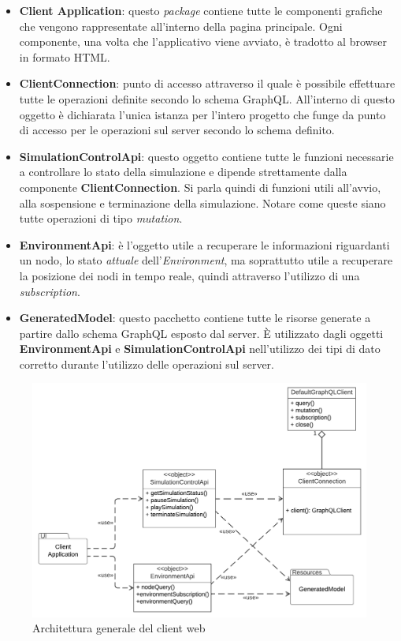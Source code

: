 \begin{itemize}
	\item \textbf{Client Application}: questo \textit{package} contiene tutte le componenti grafiche che vengono rappresentate all'interno della pagina principale. Ogni componente, una volta che l'applicativo viene avviato, è tradotto al browser in formato HTML.
	\item \textbf{ClientConnection}: punto di accesso attraverso il quale è possibile effettuare tutte le operazioni definite secondo lo schema GraphQL. All'interno di questo oggetto è dichiarata l'unica istanza per l'intero progetto che funge da punto di accesso per le operazioni sul server secondo lo schema definito. 
	\item \textbf{SimulationControlApi}: questo oggetto contiene tutte le funzioni necessarie a controllare lo stato della simulazione e dipende strettamente dalla componente \textbf{ClientConnection}. Si parla quindi di funzioni utili all'avvio, alla sospensione e terminazione della simulazione. Notare come queste siano tutte operazioni di tipo \textit{mutation}.
	\item \textbf{EnvironmentApi}: è l'oggetto utile a recuperare le informazioni riguardanti un nodo, lo stato \textit{attuale} dell'\textit{Environment}, ma soprattutto utile a recuperare la posizione dei nodi in tempo reale, quindi attraverso l'utilizzo di una \textit{subscription}. 
	\item \textbf{GeneratedModel}: questo pacchetto contiene tutte le risorse generate a partire dallo schema GraphQL esposto dal server. È utilizzato dagli oggetti \textbf{EnvironmentApi} e \textbf{SimulationControlApi} nell'utilizzo dei tipi di dato corretto durante l'utilizzo delle operazioni sul server.
\end{itemize}

\begin{figure}[htb]
	\centering
	\includegraphics[scale=0.5]{imgs/General_Architecture_Web_Client.pdf}
	\caption{Architettura generale del client web}
	\label{fig:general-client-architecture-graphics}
\end{figure}

